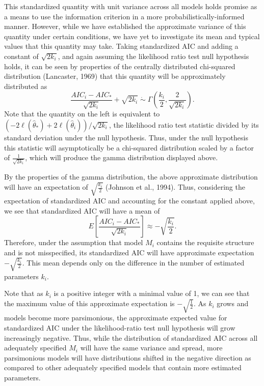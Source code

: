 		This standardized quantity with unit variance across all models holds promise as a means to use the information criterion in a more probabilistically-informed manner. However, while we have established
		the approximate variance of this quantity under certain conditions, we have yet to investigate its mean and typical values that this quantity may take. Taking
		standardized AIC and adding a constant of $\sqrt{2 k_i}$, and again assuming the likelihood ratio test null hypothesis holds, it can be seen by properties of the centrally distributed
		chi-squared distribution (Lancaster, 1969) that this quantity will be approximately distributed as
		\begin{equation*}
			\frac{AIC_i - AIC_*}{\sqrt{2k_i}} + \sqrt{2k_i} \; \dot\sim \; \Gamma \left( \frac{k_i}{2}, \frac{2}{\sqrt{2k_i}} \right) .
		\end{equation*}
		Note that the quantity on the left is equivalent to $ \left( -2 \ell (\hat{\theta}_*) + 2 \ell (\hat{\theta}_i) \right) / \sqrt{2k_i}$, the likelihood ratio test statistic
		divided by its standard deviation under the null hypothesis. Thus, under the null hypothesis this statistic will asymptotically be a chi-squared distribution scaled by a factor of $\frac{1}{\sqrt{2k_i}}$,
		which will produce the gamma distribution displayed above.

		By the properties of the gamma distribution, the above approximate distribution will have an expectation of $\sqrt{\frac{k_i}{2}}$ (Johnson et al., 1994). Thus, considering the expectation
		of standardized AIC and accounting for the constant applied above, we see that standardized AIC will have a mean of
		\begin{equation*}
			E \left[ \frac{AIC_i - AIC_*}{\sqrt{2k_i}} \right] \approx -\sqrt{\frac{k_i}{2}} .
		\end{equation*}
		Therefore, under the assumption that model $M_i$ contains the requisite structure and is not misspecified, its standardized AIC will have approximate expectation $-\sqrt{\frac{k_i}{2}}$. This mean depends only
		on the difference in the number of estimated parameters $k_i$.

		Note that as $k_i$ is a positive integer with a minimal value of 1, we can see that the maximum value of this approximate expectation is $- \sqrt{\frac{1}{2}}$. As $k_i$ grows and models
		become more parsimonious, the approximate expected value for standardized AIC under the likelihood-ratio test null hypothesis will grow increasingly negative. Thus, while the distribution of
		standardized AIC across all adequately specified $M_i$ will have the same variance and spread, more parsimonious models will have distributions shifted in the negative direction as
		compared to other adequately specified models that contain more estimated parameters.

